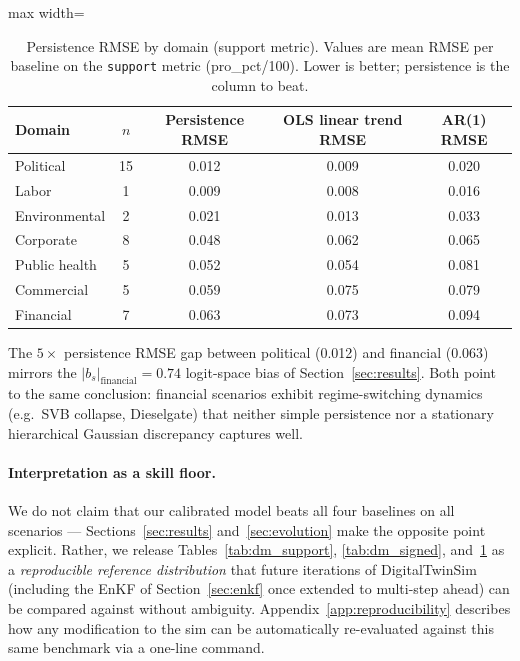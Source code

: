 \documentclass[12pt]{article}
\begin{document}
\begin{table}[H]
\centering
\caption{Persistence RMSE by domain (support metric). Values are mean RMSE per baseline on the \texttt{support} metric (pro\_pct/100). Lower is better; persistence is the column to beat.}
\label{tab:dm_by_domain}
\begin{adjustbox}{max width=\textwidth}
\begin{tabular}{@{}lcccc@{}}
\toprule
Domain & $n$ & Persistence RMSE & OLS linear trend RMSE & AR(1) RMSE \\
\midrule
Political      & 15 & 0.012 & 0.009 & 0.020 \\
Labor          &  1 & 0.009 & 0.008 & 0.016 \\
Environmental  &  2 & 0.021 & 0.013 & 0.033 \\
Corporate      &  8 & 0.048 & 0.062 & 0.065 \\
Public health  &  5 & 0.052 & 0.054 & 0.081 \\
Commercial     &  5 & 0.059 & 0.075 & 0.079 \\
Financial      &  7 & 0.063 & 0.073 & 0.094 \\
\bottomrule
\end{tabular}
\end{adjustbox}
\end{table}

The $5\times$ persistence RMSE gap between political (0.012) and financial (0.063) mirrors the $|b_s|_\text{financial} = 0.74$ logit-space bias of Section~\ref{sec:results}. Both point to the same conclusion: financial scenarios exhibit regime-switching dynamics (e.g.\ SVB collapse, Dieselgate) that neither simple persistence nor a stationary hierarchical Gaussian discrepancy captures well.

\paragraph{Interpretation as a skill floor.} We do not claim that our calibrated model beats all four baselines on all scenarios --- Sections~\ref{sec:results} and~\ref{sec:evolution} make the opposite point explicit. Rather, we release Tables~\ref{tab:dm_support}, \ref{tab:dm_signed}, and~\ref{tab:dm_by_domain} as a \emph{reproducible reference distribution} that future iterations of DigitalTwinSim (including the EnKF of Section~\ref{sec:enkf} once extended to multi-step ahead) can be compared against without ambiguity. Appendix~\ref{app:reproducibility} describes how any modification to the sim can be automatically re-evaluated against this same benchmark via a one-line command.
\end{document}
